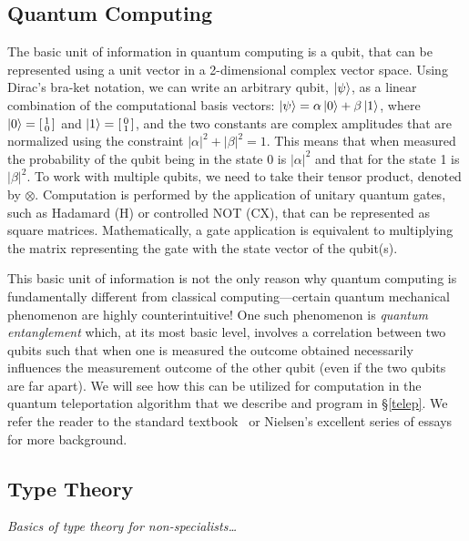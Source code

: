 \documentclass[acmsmall,nonacm,timestamp,review]{acmart}
\begin{document}
\subsection{Quantum Computing}
The basic unit of information in quantum computing is a qubit, that can be represented using a unit vector in a 2-dimensional complex vector space. Using Dirac's bra-ket notation, we can write an arbitrary qubit, $\ket{\psi}$, as a linear combination of the computational basis vectors: $\ket{\psi} = \alpha\ket{0} + \beta\ket{1}$, where $\ket{0}=\begin{bsmallmatrix}
1 \\
0
\end{bsmallmatrix}$ and $\ket{1}=\begin{bsmallmatrix}
0 \\
1
\end{bsmallmatrix}$, and the two constants are complex amplitudes that are normalized using the constraint $|\alpha|^2 +|\beta|^2 = 1$. This means that when measured the probability of the qubit being in the state 0 is $|\alpha|^2$ and that for the state 1 is $|\beta|^2$. To work with multiple qubits, we need to take their tensor product, denoted by $\otimes$. Computation is performed by the application of unitary quantum gates, such as Hadamard (H) or controlled NOT (CX), that can be represented as square matrices. Mathematically, a gate application is equivalent to multiplying the matrix representing the gate with the state vector of the qubit(s).

This basic unit of information is not the only reason why quantum computing is fundamentally different from classical computing---certain quantum mechanical phenomenon are highly counterintuitive! One such phenomenon is \textit{quantum entanglement} which, at its most basic level, involves a correlation between two qubits such that when one is measured the outcome obtained necessarily influences the measurement outcome of the other qubit (even if the two qubits are far apart). We will see how this can be utilized for computation in the quantum teleportation algorithm that we describe and program in \S\ref{telep}. We refer the reader to the standard textbook~\cite{nielsen_quantum_2010} or Nielsen's excellent series of essays~\cite{matuschak2019} for more background.

\subsection{Type Theory}
\textit{Basics of type theory for non-specialists\ldots}
\end{document}
